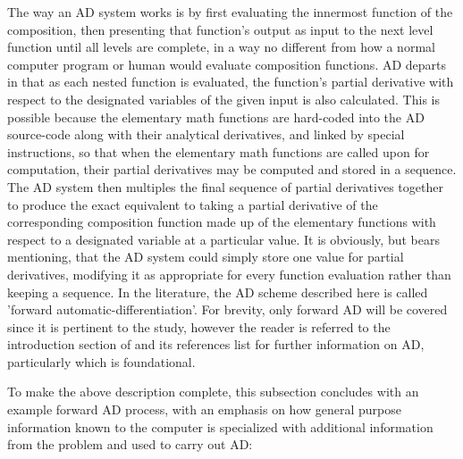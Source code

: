 \documentclass[preprint,12pt]{elsarticle}
\begin{document}
The way an AD system works is by first evaluating the innermost function of the composition, then presenting
that function's output as input to the next level function until all levels are complete, in a way no
different from how a normal computer program or human would evaluate composition functions.
AD departs in that as each nested function is evaluated, the function's
partial derivative with respect to the designated variables of the given input is also calculated.
This is possible because the elementary math functions are hard-coded into the
AD source-code along with their analytical derivatives, and linked by special instructions, so that when
the elementary math functions are called upon for computation, their partial derivatives may be computed and
stored in a sequence. The AD system then multiples the final sequence of partial derivatives together to
produce the exact equivalent to taking a partial derivative of the corresponding composition
function made up of the elementary functions with respect to a designated variable at a particular
value. It is obviously, but bears mentioning, that the AD system could simply store one value for partial
derivatives, modifying it as appropriate for every function evaluation rather than keeping a sequence.
In the literature, the AD scheme described here is called 'forward automatic-differentiation'. For
brevity, only forward AD will be covered since it is pertinent to the study, however the reader is referred
to the introduction section of \cite{ref-AD-methods} and its references list for further information on AD,
particularly \cite{ref-on-AD} which is foundational. 

To make the above description complete, this subsection concludes with an example forward AD process, with 
an emphasis on how general purpose information known to the computer is specialized with additional
information from the problem and used to carry out AD:
\end{document}
